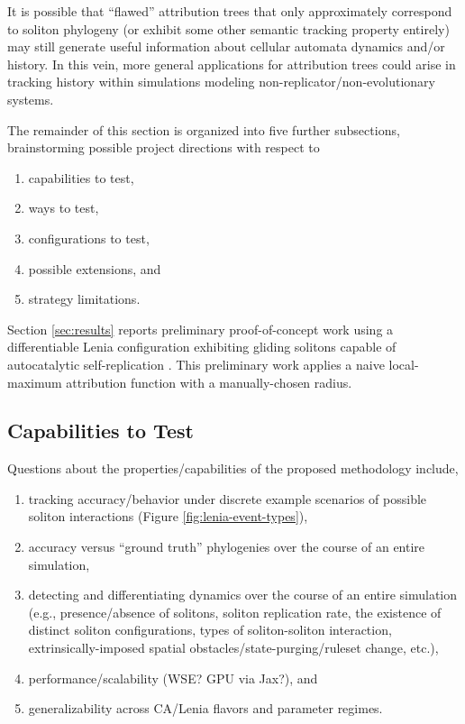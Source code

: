 It is possible that ``flawed'' attribution trees that only approximately correspond to soliton phylogeny (or exhibit some other semantic tracking property entirely) may still generate useful information about cellular automata dynamics and/or history.
In this vein, more general applications for attribution trees could arise in tracking history within simulations modeling non-replicator/non-evolutionary systems.

The remainder of this section is organized into five further subsections, brainstorming possible project directions with respect to
\begin{enumerate}
\item capabilities to test,
\item ways to test,
\item configurations to test,
\item possible extensions, and
\item strategy limitations.
\end{enumerate}

Section \ref{sec:results} reports preliminary proof-of-concept work using a differentiable Lenia configuration exhibiting gliding solitons capable of autocatalytic self-replication \citep{hamon2022learning}.
This preliminary work applies a naive local-maximum attribution function with a manually-chosen radius.

\subsection{Capabilities to Test}

Questions about the properties/capabilities of the proposed methodology include,
\begin{enumerate}
\item tracking accuracy/behavior under discrete example scenarios of possible soliton interactions (Figure \ref{fig:lenia-event-types}),
\item accuracy versus ``ground truth'' phylogenies over the course of an entire simulation,
\item detecting and differentiating dynamics over the course of an entire simulation (e.g., presence/absence of solitons, soliton replication rate, the existence of distinct soliton configurations, types of soliton-soliton interaction, extrinsically-imposed spatial obstacles/state-purging/ruleset change, etc.),
\item performance/scalability (WSE? GPU via Jax?), and
\item generalizability across CA/Lenia flavors and parameter regimes.
\end{enumerate}

